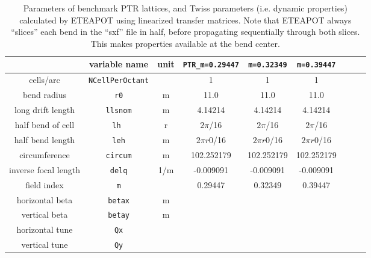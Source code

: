 \documentclass[12pt]{article}
\begin{document}
\begin{table}[h]
\begin{tabular}{|c|c|c|c|c|c|c|c|c|}        \hline
                        & variable name         & unit & {\tt  PTR\_m=0.29447} & {\tt m=0.32349} & {\tt m=0.39447} \\ \hline
cells/arc         & {\tt NCellPerOctant} &        &       1                              &       1                    &        1                   \\
bend radius       &  {\tt r0}                 &  m   &     11.0                           &      11.0                &       11.0               \\
long drift length &  {\tt llsnom}         &  m   &         4.14214                  &     4.14214           &    4.14214            \\
half bend of cell & {\tt lh }                &  r    &         $2\pi$/16                  &      $2\pi$/16        &       $2\pi$/16        \\
half bend length  & {\tt leh}            &  m   &          $2\pi r0$/16             &    $2\pi r0$/16      &       $2\pi r0$/16     \\
circumference     & {\tt circum}      &  m   &      102.252179                &         102.252179  &   102.252179       \\ \hline
inverse focal length &  {\tt delq}     & 1/m  &     -0.009091                   &       -0.009091       &     -0.009091       \\
field index       &  {\tt m}                 &          &              0.29447             &       0.32349         &      0.39447          \\ \hline
horizontal beta  & {\tt betax}          &  m    &                                        &                             &                              \\
vertical beta     & {\tt betay}           &  m    &                                        &                            &                             \\ \hline
horizontal tune  &  {\tt Qx}              &        &                                         &                            &                              \\
vertical tune     &  {\tt Qy}               &        &                                         &                           &                                  \\
\hline
\end{tabular}
\caption{\label{tbl:benchmarkParams.1}Parameters of benchmark PTR lattices, 
and Twiss parameters (i.e. dynamic properties) calculated by ETEAPOT using linearized transfer matrices.  Note that 
ETEAPOT always ``slices'' each bend in the ``sxf'' file in half, before propagating sequentially through 
both slices.  This makes properties available at the bend center.} 
\end{table}
%
\end{document}
